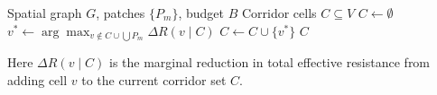 \begin{algorithm}[H]
\caption{Greedy Corridor Placement}
\label{alg:corridor}
\begin{algorithmic}[1]
\REQUIRE Spatial graph $G$, patches $\{P_m\}$, budget $B$
\ENSURE Corridor cells $C \subseteq V$
\STATE $C \leftarrow \emptyset$
  \STATE $v^* \leftarrow \arg\max_{v \notin C \cup \bigcup P_m}
    \Delta R(v \mid C)$
  \STATE $C \leftarrow C \cup \{v^*\}$
\ENDFOR
\RETURN $C$
\end{algorithmic}
\end{algorithm}

Here $\Delta R(v \mid C)$ is the marginal reduction in total effective
resistance from adding cell $v$ to the current corridor set $C$.


